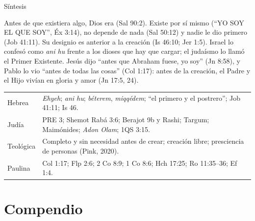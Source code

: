 \documentclass[hyperref={bookmarks=false},aspectratio=169]{beamer}
\begin{document}
\begin{frame}{Síntesis}
\begin{tcolorbox}[colback=papiro,colframe=azul,boxrule=1pt,arc=3pt]
\scriptsize Antes de que existiera algo, Dios era (Sal 90:2). Existe por sí mismo (``YO SOY EL QUE SOY'', Éx 3:14), no depende de nada (Sal 50:12) y nadie le dio primero (Job 41:11). Su designio es anterior a la creación (Is 46:10; Jer 1:5). Israel lo confesó como \emph{ani hu} frente a los dioses que hay que cargar; el judaísmo lo llamó el Primer Existente. Jesús dijo ``antes que Abraham fuese, yo soy'' (Jn 8:58), y Pablo lo vio ``antes de todas las cosas'' (Col 1:17): antes de la creación, el Padre y el Hijo vivían en gloria y amor (Jn 17:5, 24).
\end{tcolorbox}
\scriptsize\renewcommand{\arraystretch}{1.12}
\begin{tabular}{@{}>{\RaggedRight\arraybackslash}p{1.7cm}>{\RaggedRight\arraybackslash}p{10.1cm}@{}}
\toprule
Hebrea & \emph{Ehyeh}; \emph{ani hu}; \emph{béterem}, \emph{miqqédem}; ``el primero y el postrero''; Job 41:11; Is 46. \\
Judía & PRE 3; Shemot Rabá 3:6; Berajot 9b y Rashi; Targum; Maimónides; \emph{Adon Olam}; 1QS 3:15. \\
Teológica & Completo y sin necesidad antes de crear; creación libre; presciencia de personas (Pink, 2020). \\
Paulina & Col 1:17; Flp 2:6; 2 Co 8:9; 1 Co 8:6; Hch 17:25; Ro 11:35--36; Ef 1:4. \\
\bottomrule
\end{tabular}
\end{frame}

\section{Compendio}
\end{document}
